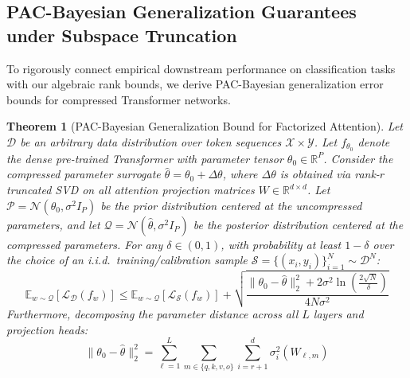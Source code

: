 \documentclass{article}
\newtheorem{theorem}{Theorem}
\begin{document}
\subsection{PAC-Bayesian Generalization Guarantees under Subspace Truncation}
To rigorously connect empirical downstream performance on classification tasks with our algebraic rank bounds, we derive PAC-Bayesian generalization error bounds for compressed Transformer networks.

\begin{theorem}[PAC-Bayesian Generalization Bound for Factorized Attention]
\label{thm:pac_bayes}
Let $\mathcal{D}$ be an arbitrary data distribution over token sequences $\mathcal{X} \times \mathcal{Y}$. Let $f_{\theta_0}$ denote the dense pre-trained Transformer with parameter tensor $\theta_0 \in \mathbb{R}^P$. Consider the compressed parameter surrogate $\hat{\theta} = \theta_0 + \Delta \theta$, where $\Delta \theta$ is obtained via rank-$r$ truncated SVD on all attention projection matrices $W \in \mathbb{R}^{d \times d}$. Let $\mathcal{P} = \mathcal{N}(\theta_0, \sigma^2 I_P)$ be the prior distribution centered at the uncompressed parameters, and let $\mathcal{Q} = \mathcal{N}(\hat{\theta}, \sigma^2 I_P)$ be the posterior distribution centered at the compressed parameters. 
For any $\delta \in (0, 1)$, with probability at least $1 - \delta$ over the choice of an i.i.d.\ training/calibration sample $\mathcal{S} = \{(x_i, y_i)\}_{i=1}^N \sim \mathcal{D}^N$:
\begin{equation}
    \mathbb{E}_{w \sim \mathcal{Q}} \left[ \mathcal{L}_{\mathcal{D}}(f_w) \right] \le \mathbb{E}_{w \sim \mathcal{Q}} \left[ \mathcal{L}_{\mathcal{S}}(f_w) \right] + \sqrt{\frac{\|\theta_0 - \hat{\theta}\|_2^2 + 2 \sigma^2 \ln\left(\frac{2\sqrt{N}}{\delta}\right)}{4 N \sigma^2}}
\end{equation}
Furthermore, decomposing the parameter distance across all $L$ layers and projection heads:
\begin{equation}
    \|\theta_0 - \hat{\theta}\|_2^2 = \sum_{\ell=1}^L \sum_{m \in \{q, k, v, o\}} \sum_{i=r+1}^d \sigma_i^2(W_{\ell, m})
\end{equation}
\end{theorem}
\end{document}

